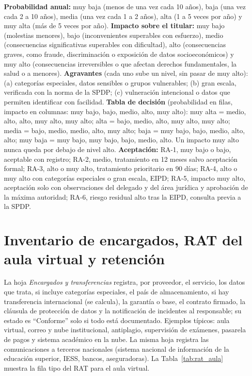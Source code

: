 \textbf{Probabilidad anual:} muy baja (menos de una vez cada 10 años), baja (una vez cada 2 a 10 años), media (una vez cada 1 a 2 años), alta (1 a 5 veces por año) y muy alta (más de 5 veces por año). \textbf{Impacto sobre el titular:} muy bajo (molestias menores), bajo (inconvenientes superables con esfuerzo), medio (consecuencias significativas superables con dificultad), alto (consecuencias graves, como fraude, discriminación o exposición de datos socioeconómicos) y muy alto (consecuencias irreversibles o que afectan derechos fundamentales, la salud o a menores). \textbf{Agravantes} (cada uno sube un nivel, sin pasar de muy alto): (a) categorías especiales, datos sensibles o grupos vulnerables; (b) gran escala, verificada con la norma de la SPDP; (c) vulneración intencional o datos que permiten identificar con facilidad. \textbf{Tabla de decisión} (probabilidad en filas, impacto en columnas: muy bajo, bajo, medio, alto, muy alto): muy alta = medio, alto, alto, muy alto, muy alto; alta = bajo, medio, alto, muy alto, muy alto; media = bajo, medio, medio, alto, muy alto; baja = muy bajo, bajo, medio, alto, alto; muy baja = muy bajo, muy bajo, bajo, medio, alto. Un impacto muy alto nunca queda por debajo de nivel alto. \textbf{Aceptación:} RA-1, muy bajo o bajo, aceptable con registro; RA-2, medio, tratamiento en 12 meses salvo aceptación formal; RA-3, alto o muy alto, tratamiento prioritario en 90 días; RA-4, alto o muy alto con categorías especiales o gran escala, EIPD; RA-5, impacto muy alto, aceptación solo con observaciones del delegado y del área jurídica y aprobación de la máxima autoridad; RA-6, riesgo residual alto tras la EIPD, consulta previa a la SPDP.

\section{Inventario de encargados, RAT del aula virtual y retención}

La hoja \textit{Encargados y transferencias} registra, por proveedor, el servicio, los datos que trata, si incluye categorías especiales, el país de almacenamiento, si hay transferencia internacional (se calcula), la garantía o base, el contrato firmado, la cláusula de protección de datos \cite[art.~41]{rlopdp2023} y la notificación de incidentes al responsable; su estado es ``Conforme'' solo si todo está documentado. Ejemplos típicos: aula virtual, correo y nube institucional, antiplagio, supervisión de exámenes, pasarela de pagos y sistema académico en la nube. La misma hoja registra las comunicaciones a terceros nacionales (sistema nacional de información de la educación superior, IESS, bancos, aseguradoras). La Tabla~\ref{tab:rat_aula} muestra la fila tipo del RAT para el aula virtual.

